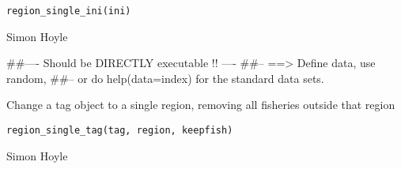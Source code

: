 \documentclass[a4paper]{book}
\begin{document}
%
\begin{Usage}
\begin{verbatim}
region_single_ini(ini)
\end{verbatim}
\end{Usage}
%
\begin{Arguments}
\begin{ldescription}
\item[\code{ini}] 


\end{ldescription}
\end{Arguments}
%
\begin{Author}\relax

Simon Hoyle
\end{Author}
%
\begin{Examples}
\begin{ExampleCode}
##---- Should be DIRECTLY executable !! ----
##-- ==>  Define data, use random,
##--	or do  help(data=index)  for the standard data sets.

\end{ExampleCode}
\end{Examples}
%
\begin{Description}\relax

Change a tag object to a single region, removing all fisheries outside that region
\end{Description}
%
\begin{Usage}
\begin{verbatim}
region_single_tag(tag, region, keepfish)
\end{verbatim}
\end{Usage}
%
\begin{Arguments}
\begin{ldescription}
\item[\code{tag}] 


\item[\code{region}] 


\item[\code{keepfish}] 


\end{ldescription}
\end{Arguments}
%
\begin{Author}\relax

Simon Hoyle
\end{Author}
\end{document}
